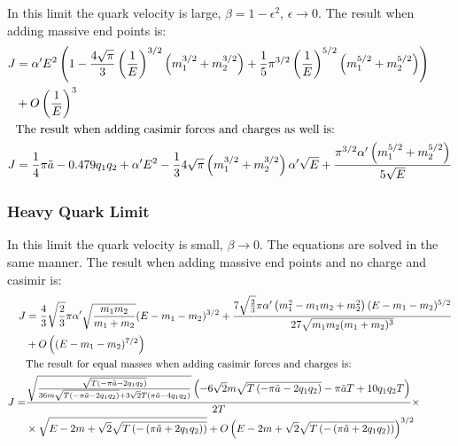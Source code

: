 \documentclass[11pt,a4paper]{article}
\begin{document}
In this limit the quark velocity is large, $\beta=1-\epsilon^{2}$, $\epsilon\rightarrow0$.
The result when adding massive end points is:
\begin{subequations}
\label{eq:reggeAnalyticLight}
\begin{align}
J&=\alpha' E^2\left(1-\frac{4\sqrt{\pi}}{3}\left(\frac{1}{E}\right)^{3/2}\left(m_{1}^{3/2}+m_{2}^{3/2}\right)+\frac{1}{5}\pi^{3/2}\left(\frac{1}{E}\right)^{5/2}\left(m_{1}^{5/2}+m_{2}^{5/2}\right)\right)\notag\\
&+O\left(\frac{1}{E}\right)^{3}\\
&\text{The result when adding casimir forces and charges as well is:}\notag\\
J&=\frac{1}{4}\pi\tilde{a}-0.479 q_1q_2+\alpha' E^2-\frac{1}{3}4 \sqrt{\pi }  \left(m_1^{3/2}+m_2^{3/2}\right)\alpha'\sqrt{E}+\frac{\pi^{3/2}\alpha' \left(m_1^{5/2}+m_2^{5/2}\right)}{5 \sqrt{E}}
\end{align}
\end{subequations}
\FloatBarrier 
 \subsubsection{Heavy Quark Limit}
 
In this limit the quark velocity is small, $\beta\rightarrow0$. The equations are solved in the same manner. The result when adding massive end points and no charge and casimir is:
\begin{subequations}
\label{eq:reggeAnalyticHeavy}
\begin{align}
J&=\frac{4}{3}\sqrt{\frac{2}{3}}\pi\alpha'\sqrt{\frac{m_{1}m_{2}}{m_{1}+m_{2}}}(E-m_{1}-m_{2})^{3/2}+\frac{7\sqrt{\frac{2}{3}}\pi\alpha'\left(m_{1}^{2}-m_{1}m_{2}+m_{2}^{2}\right)(E-m_{1}-m_{2})^{5/2}}{27\sqrt{m_{1}m_{2}(m_{1}+m_{2})^{3}}}\notag\\
&+O\left((E-m_{1}-m_{2})^{7/2}\right)\\
&\text{The result for equal masses when adding casimir forces and charges is:}\notag\\
J=&
\frac{\sqrt{\frac{\sqrt{T \left(-\pi\tilde{a}-2 q_1q_2\right)}}{36 m \sqrt{T \left(-\pi\tilde{a}-2 q_1q_2\right)}+3 \sqrt{2} T \left(\pi\tilde{a}-4q_1q_2\right)}} \left(-6 \sqrt{2} m \sqrt{T \left(-\pi\tilde{a}-2 q_1q_2\right)}-\pi\tilde{a} T+10q_1q_2T\right)}{2 T}\times\notag\\ 
&\times\sqrt{E-2m+\sqrt{2}\sqrt{T\left(-\left(\pi\tilde{a}+2q_1q_2\right)\right)}}
+O\left(E-2m+\sqrt{2}\sqrt{T\left(-\left(\pi\tilde{a}+2q_1q_2\right)\right)}\right)^{3/2}
\end{align}
\end{subequations}
\FloatBarrier
\end{document}
